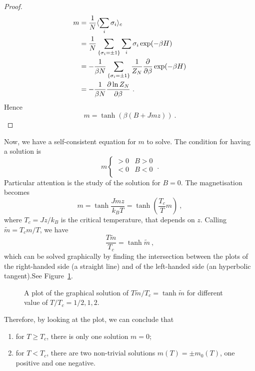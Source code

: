 \begin{proof}
\begin{equation*}
\begin{aligned}
             m & = \frac{1}{N} \langle\sum_i \sigma_i\rangle_c \\ & = \frac{1}{N} \sum_{\{\sigma_i = \pm 1\}} \sum_i \sigma_i \exp(- \beta H) \\ & = - \frac{1}{\beta N} \sum_{\{\sigma_i = \pm 1\}} \frac{1}{Z_N} \frac{\partial}{\partial\beta} \exp(- \beta H) \\ & = - \frac{1}{\beta N} \frac{\partial\ln Z_N}{\partial\beta} ~.
        \end{aligned}
        \end{equation*}
        Hence 
        \begin{equation*}
            m = \tanh (\beta (B + J m z)) ~.
        \end{equation*}
    \end{proof}
    
    Now, we have a self-consistent equation for $m$ to solve. The condition for having a solution is 
    \begin{equation}\label{ph:m1}
        m \begin{cases}
            > 0 & B > 0 \\
            < 0 & B < 0 \\
        \end{cases} ~.
    \end{equation}
    Particular attention is the study of the solution for $B = 0$. The magnetisation becomes
    \begin{equation*}
        m = \tanh \frac{J m z}{k_B T} = \tanh (\frac{T_c}{T} m) ~,
    \end{equation*}
    where $T_c = J z / k_B$ is the critical temperature, that depends on $z$. Calling $\tilde m = T_c m / T$, we have 
    \begin{equation*}
        \frac{T \tilde m}{T_c} = \tanh \tilde m ~,
    \end{equation*}
    which can be solved graphically by finding the intersection between the plots of the right-handed side (a straight line) and of the left-handed side (an hyperbolic tangent).See Figure~\ref{mf:m}.
    \begin{figure}[h!]
        \centering
        \caption{A plot of the graphical solution of $T \tilde m / T_c = \tanh \tilde m$ for different value of $T/T_c = 1/2, 1, 2$.}
        \label{mf:m}
    \end{figure}
    Therefore, by looking at the plot, we can conclude that 
    \begin{enumerate}
        \item for $T \geq T_c$, there is only one solution $m = 0$;
        \item for $T < T_c$, there are two non-trivial solutions $m(T) = \pm m_0 (T)$, one positive and one negative.
    \end{enumerate}
